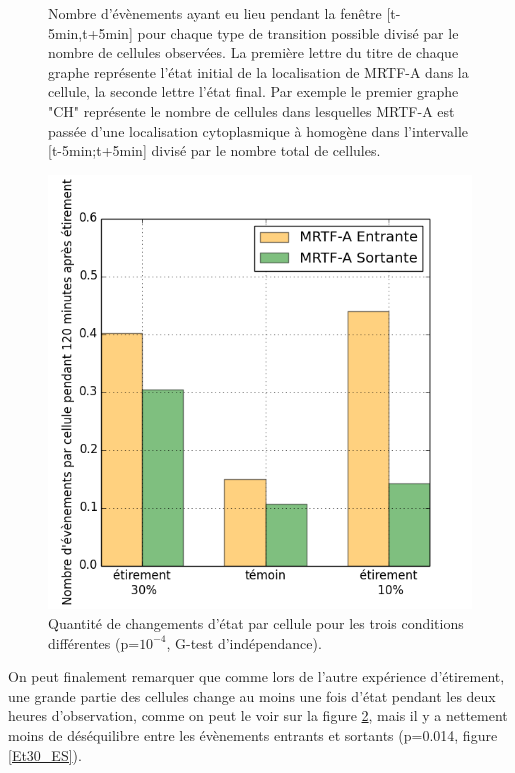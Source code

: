\begin{figure}
\caption{\label{Et30_transloc} Nombre d'évènements ayant eu lieu pendant la fenêtre [t-5min,t+5min] pour chaque type de transition possible divisé par le nombre de cellules observées. La première lettre du titre de chaque graphe représente l'état initial de la localisation de MRTF-A dans la cellule, la seconde lettre l'état final. Par exemple le premier graphe "CH" représente le nombre de cellules dans lesquelles MRTF-A est passée d'une localisation cytoplasmique à homogène dans l'intervalle [t-5min;t+5min] divisé par le nombre total de cellules. }
\end{figure}

\begin{figure}
\includegraphics[scale=0.5]{Figures/Etirement30_vs_temoin_activite.png}
\caption{\label{Et30_activite} Quantité de changements d'état par cellule pour les trois conditions différentes (p=$10^{-4}$, G-test d'indépendance).}
\end{figure}

On peut finalement remarquer que comme lors de l'autre expérience d'étirement, une grande partie des cellules change au moins une fois d'état pendant les deux heures d'observation, comme on peut le voir sur la figure \ref{Et30_activite}, mais il y a nettement moins de déséquilibre entre les évènements entrants et sortants (p=0.014, figure \ref{Et30_ES}). 

